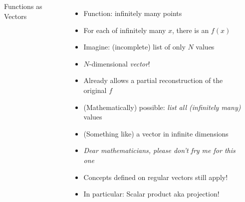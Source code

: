 
\begin{frame}[fragile]
%
\begin{columns}[T]
\begin{Large}
	{Functions as Vectors}
	\vspace{6pt}
\end{Large}
%
\begin{itemize}
\item Function: infinitely many points
\item For each of infinitely many $x$, there is an $f(x)$
\item Imagine: (incomplete) list of only $N$ values
\item[\Thus] $N$-dimensional \emph{vector}!
\item Already allows a partial reconstruction of the original $f$
\item (Mathematically) possible: \emph{list all (infinitely many)} values
\item[\Thus] (Something like) a vector in infinite dimensions
\item \emph{Dear mathematicians, please don't fry me for this one}
\item Concepts defined on regular vectors still apply!
\item In particular: Scalar product aka projection!
\end{itemize}
%
\begin{center}
	\tiny

\end{center}
\end{columns}
\end{frame}
